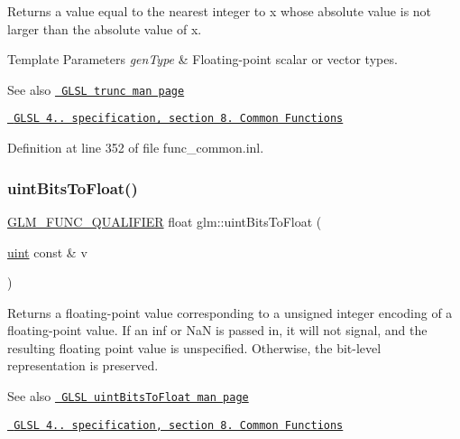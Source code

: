 Returns a value equal to the nearest integer to x whose absolute value is not larger than the absolute value of x.


\begin{DoxyTemplParams}{Template Parameters}
{\em gen\+Type} & Floating-\/point scalar or vector types.\\
\hline
\end{DoxyTemplParams}
\begin{DoxySeeAlso}{See also}
\href{http://www.opengl.org/sdk/docs/manglsl/xhtml/trunc.xml}{\texttt{ G\+L\+SL trunc man page}} 

\href{http://www.opengl.org/registry/doc/GLSLangSpec.4.20.8.pdf}{\texttt{ G\+L\+SL 4.. specification, section 8. Common Functions}} 
\end{DoxySeeAlso}


Definition at line 352 of file func\+\_\+common.\+inl.

\mbox{\label{group__core__func__common_ga97464ca9ff4267de30ea408f700d4ca8}} 
\subsubsection{\texorpdfstring{uintBitsToFloat()}{uintBitsToFloat()}\hspace{0.1cm}{\footnotesize\ttfamily [1/2]}}
{\footnotesize\ttfamily \mbox{\hyperlink{setup_8hpp_a33fdea6f91c5f834105f7415e2a64407}{G\+L\+M\+\_\+\+F\+U\+N\+C\+\_\+\+Q\+U\+A\+L\+I\+F\+I\+ER}} float glm\+::uint\+Bits\+To\+Float (\begin{DoxyParamCaption}\item[{\mbox{\hyperlink{group__core__precision_ga4fd29415871152bfb5abd588334147c8}{uint}} const \&}]{v }\end{DoxyParamCaption})}

Returns a floating-\/point value corresponding to a unsigned integer encoding of a floating-\/point value. If an inf or NaN is passed in, it will not signal, and the resulting floating point value is unspecified. Otherwise, the bit-\/level representation is preserved.

\begin{DoxySeeAlso}{See also}
\href{http://www.opengl.org/sdk/docs/manglsl/xhtml/uintBitsToFloat.xml}{\texttt{ G\+L\+SL uint\+Bits\+To\+Float man page}} 

\href{http://www.opengl.org/registry/doc/GLSLangSpec.4.20.8.pdf}{\texttt{ G\+L\+SL 4.. specification, section 8. Common Functions}} 
\end{DoxySeeAlso}


